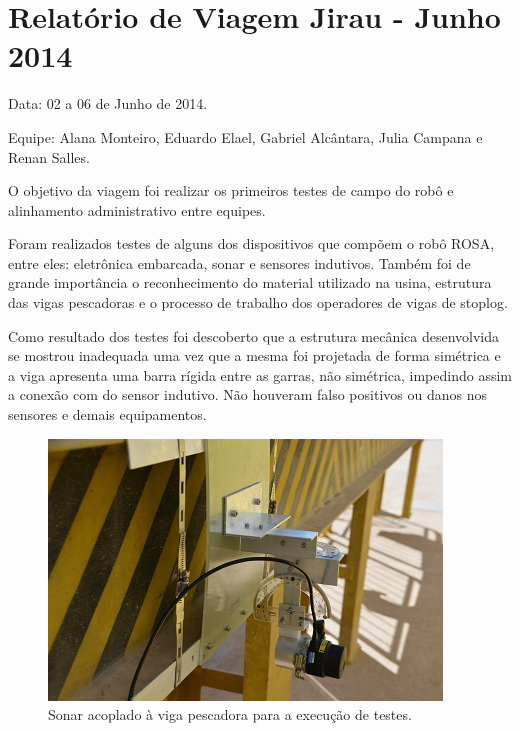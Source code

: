 \section{Relatório de Viagem Jirau - Junho 2014}
Data: 02 a 06 de Junho de 2014.

Equipe: Alana Monteiro, Eduardo Elael, Gabriel Alcântara, Julia Campana e Renan
Salles.

O objetivo da viagem foi realizar os primeiros testes de campo do robô e
alinhamento administrativo entre equipes.

Foram realizados testes de alguns dos dispositivos que compõem o
robô ROSA, entre eles: eletrônica embarcada, sonar e sensores indutivos. Também
foi de grande importância o reconhecimento do material utilizado na usina,
estrutura das vigas pescadoras e o processo de trabalho dos operadores de vigas
de stoplog.

Como resultado dos testes foi descoberto que a estrutura mecânica desenvolvida
se mostrou inadequada uma vez que a mesma foi projetada de forma simétrica e a
viga apresenta uma barra rígida entre as garras, não simétrica, impedindo assim
a conexão com do sensor indutivo. Não houveram falso positivos ou danos nos
sensores e demais equipamentos.

\begin{figure}[h!]
\centering
  \includegraphics[width=1\linewidth]{Fotos/JirauJunho2014/1.JPG}
  \caption{Sonar acoplado à viga pescadora para a execução de testes.}
  \label{nov20131}
\end{figure}

